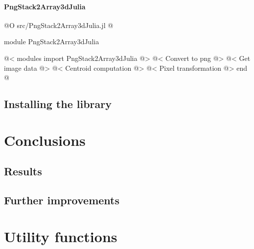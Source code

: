 \documentclass[11pt,oneside]{article}	%
\begin{document}
\paragraph{PngStack2Array3dJulia}

@O src/PngStack2Array3dJulia.jl
@{module PngStack2Array3dJulia

@< modules import PngStack2Array3dJulia @>
@< Convert to png @>
@< Get image data @>
@< Centroid computation @>
@< Pixel transformation @>
end
@}

\subsection{Installing the library}

\section{Conclusions}\label{sec:conclusions}
\subsection{Results}

\subsection{Further improvements}



\appendix
\section{Utility functions}
\end{document}
